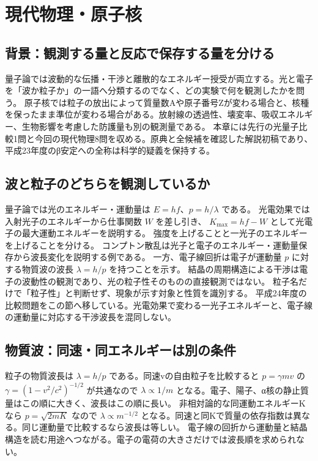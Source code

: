 \chapter{現代物理・原子核}
\section{背景：観測する量と反応で保存する量を分ける}
量子論では波動的な伝播・干渉と離散的なエネルギー授受が両立する。光と電子を「波か粒子か」の一語へ分類するのでなく、どの実験で何を観測したかを問う。
原子核では粒子の放出によって質量数Aや原子番号Zが変わる場合と、核種を保ったまま準位が変わる場合がある。放射線の透過性、壊変率、吸収エネルギー、生物影響を考慮した防護量も別の観測量である。
本章には先行の光量子比較1問と今回の現代物理8問を収める。原典と全候補を確認した解説初稿であり、平成23年度のβ安定への全称は科学的疑義を保持する。

\section{波と粒子のどちらを観測しているか}\label{theory:modern:duality}
量子論では光のエネルギー・運動量は \(E=hf\)、\(p=h/\lambda\) である。
光電効果では入射光子のエネルギーから仕事関数 \(W\) を差し引き、
\(K_{\max}=hf-W\) として光電子の最大運動エネルギーを説明する\cite{os_photoelectric}。
強度を上げることと一光子のエネルギーを上げることを分ける。
コンプトン散乱は光子と電子のエネルギー・運動量保存から波長変化を説明する例である。
一方、電子線回折は電子が運動量 \(p\) に対する物質波の波長 \(\lambda=h/p\) を持つことを示す。
結晶の周期構造による干渉は電子の波動性の観測であり、光の粒子性そのものの直接観測ではない\cite{os_matter}。
粒子名だけで「粒子性」と判断せず、現象が示す対象と性質を識別する。
平成24年度の比較問題をこの節へ移している。光電効果で変わる一光子エネルギーと、電子線の運動量に対応する干渉波長を混同しない。

\section{物質波：同速・同エネルギーは別の条件}\label{theory:modern:matter}
粒子の物質波長は \(\lambda=h/p\) である。同速vの自由粒子を比較すると \(p=\gamma mv\) の \(\gamma=(1-v^2/c^2)^{-1/2}\) が共通なので \(\lambda\propto1/m\) となる。電子、陽子、α核の静止質量はこの順に大きく、波長はこの順に長い。
非相対論的な同運動エネルギーKなら \(p=\sqrt{2mK}\) なので \(\lambda\propto m^{-1/2}\) となる。同速と同Kで質量の依存指数は異なる。同じ運動量で比較するなら波長は等しい。
電子線の回折から運動量と結晶構造を読む用途へつながる。電子の電荷の大きさだけでは波長順を求められない\cite{os_matter}。

